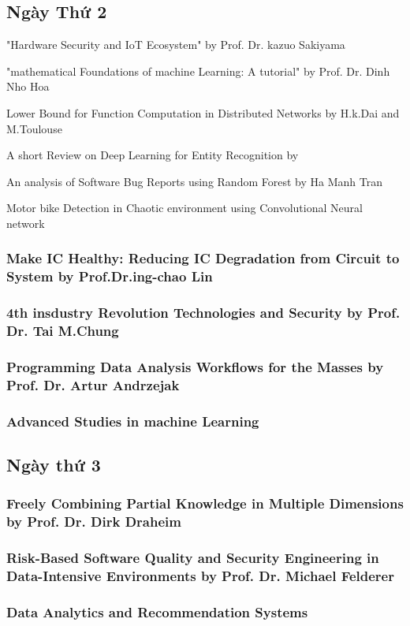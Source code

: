 \documentclass{hcmutarticle}
\begin{document}
\subsection{Ngày Thứ 2}
"Hardware Security and IoT Ecosystem" by Prof. Dr. kazuo Sakiyama

"mathematical Foundations of machine Learning: A tutorial" by Prof. Dr. Dinh Nho Hoa

Lower Bound for Function Computation in Distributed Networks by H.k.Dai and M.Toulouse

A short Review on Deep Learning for Entity Recognition by 

An analysis of Software Bug Reports using Random Forest by  
Ha Manh Tran

Motor bike Detection in Chaotic environment using Convolutional Neural network
 


\subsubsection{Make IC Healthy: Reducing IC Degradation from Circuit to System by Prof.Dr.ing-chao Lin}
\subsubsection{4th insdustry Revolution Technologies and Security by Prof. Dr. Tai M.Chung}
\subsubsection{Programming Data Analysis Workflows for the Masses by Prof. Dr. Artur Andrzejak}
\subsubsection{Advanced Studies in machine Learning}

\subsection{Ngày thứ 3}
\subsubsection{Freely Combining Partial Knowledge in Multiple Dimensions
by Prof. Dr. Dirk Draheim}
\subsubsection{Risk-Based Software Quality and Security Engineering in Data-Intensive Environments
by Prof. Dr. Michael Felderer}
\subsubsection{ Data Analytics and Recommendation Systems}
\end{document}
